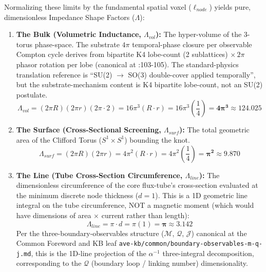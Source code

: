 Normalizing these limits by the fundamental spatial voxel ($\ell_{node}$) yields pure, dimensionless Impedance Shape Factors ($\Lambda$):

\begin{enumerate}
    \item \textbf{The Bulk (Volumetric Inductance, $\Lambda_{vol}$):} The hyper-volume of the 3-torus phase-space. The substrate $4\pi$ temporal-phase closure per observable Compton cycle derives from bipartite K4 lobe-count (2 sublattices) $\times\, 2\pi$ phasor rotation per lobe (canonical at :103-105). The standard-physics translation reference is ``SU(2) $\to$ SO(3) double-cover applied temporally'', but the substrate-mechanism content is K4 bipartite lobe-count, not an SU(2) postulate.
    \begin{equation}
        \Lambda_{vol} = (2\pi R)(2\pi r)(2\pi \cdot 2) = 16\pi^3 (R \cdot r) = 16\pi^3 \left(\frac{1}{4}\right) = \mathbf{4\pi^3} \approx 124.025
    \end{equation}

    \item \textbf{The Surface (Cross-Sectional Screening, $\Lambda_{surf}$):} The total geometric area of the Clifford Torus ($S^1 \times S^1$) bounding the knot.
    \begin{equation}
        \Lambda_{surf} = (2\pi R)(2\pi r) = 4\pi^2 (R \cdot r) = 4\pi^2 \left(\frac{1}{4}\right) = \mathbf{\pi^2} \approx 9.870
    \end{equation}

    \item \textbf{The Line (Tube Cross-Section Circumference, $\Lambda_{line}$):} The dimensionless circumference of the core flux-tube's cross-section evaluated at the minimum discrete node thickness ($d=1$). This is a 1D geometric line integral on the tube circumference, NOT a magnetic moment (which would have dimensions of area $\times$ current rather than length):
    \begin{equation}
        \Lambda_{line} = \pi \cdot d = \pi(1) = \mathbf{\pi} \approx 3.142
    \end{equation}
    Per the three-boundary-observables structure ($\mathcal{M}$, $\mathcal{Q}$, $\mathcal{J}$) canonical at the Common Foreword and KB leaf \texttt{ave-kb/common/boundary-observables-m-q-j.md}, this is the 1D-line projection of the $\alpha^{-1}$ three-integral decomposition, corresponding to the $\mathcal{Q}$ (boundary loop / linking number) dimensionality.
\end{enumerate}

